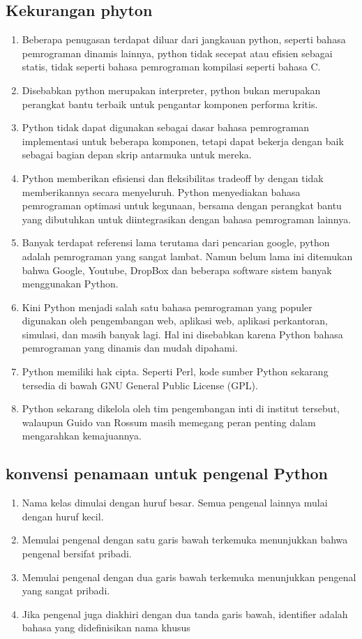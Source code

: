 \subsection{Kekurangan phyton}
\begin{enumerate}
    \item Beberapa penugasan terdapat diluar dari jangkauan python,
    seperti bahasa pemrograman dinamis lainnya, python tidak
    secepat atau efisien sebagai statis, tidak seperti bahasa
    pemrograman kompilasi seperti bahasa C.
    \item Disebabkan python merupakan interpreter, python bukan
    merupakan perangkat bantu terbaik untuk pengantar komponen performa kritis.
    \item Python tidak dapat digunakan sebagai dasar bahasa pemrograman implementasi untuk beberapa komponen, tetapi
    dapat bekerja dengan baik sebagai bagian depan skrip antarmuka untuk mereka.
    \item Python memberikan efisiensi dan fleksibilitas tradeoff by
    dengan tidak memberikannya secara menyeluruh. Python
    menyediakan bahasa pemrograman optimasi untuk kegunaan, bersama dengan perangkat bantu yang dibutuhkan
    untuk diintegrasikan dengan bahasa pemrograman lainnya.
    \item Banyak terdapat referensi lama terutama dari pencarian
    google, python adalah pemrograman yang sangat lambat.
    Namun belum lama ini ditemukan bahwa Google, Youtube,
    DropBox dan beberapa software sistem banyak menggunakan Python.
    \item Kini Python menjadi salah satu bahasa pemrograman yang
    populer digunakan oleh pengembangan web, aplikasi web,
    aplikasi perkantoran, simulasi, dan masih banyak lagi. Hal
    ini disebabkan karena Python bahasa pemrograman yang
    dinamis dan mudah dipahami.
    \item Python memiliki hak cipta. Seperti Perl, kode sumber
    Python sekarang tersedia di bawah GNU General Public
    License (GPL).
    \item Python sekarang dikelola oleh tim pengembangan inti
    di institut tersebut, walaupun Guido van Rossum masih
    memegang peran penting dalam mengarahkan kemajuannya.
\end{enumerate}
\subsection{konvensi penamaan untuk pengenal Python}
\begin{enumerate}
    \item Nama kelas dimulai dengan huruf besar. Semua pengenal lainnya mulai dengan huruf kecil.
    \item Memulai pengenal dengan satu garis bawah terkemuka menunjukkan bahwa pengenal bersifat pribadi.
    \item Memulai pengenal dengan dua garis bawah terkemuka menunjukkan pengenal yang sangat pribadi.
    \item Jika pengenal juga diakhiri dengan dua tanda garis bawah, identifier adalah bahasa yang didefinisikan nama khusus
\end{enumerate}
